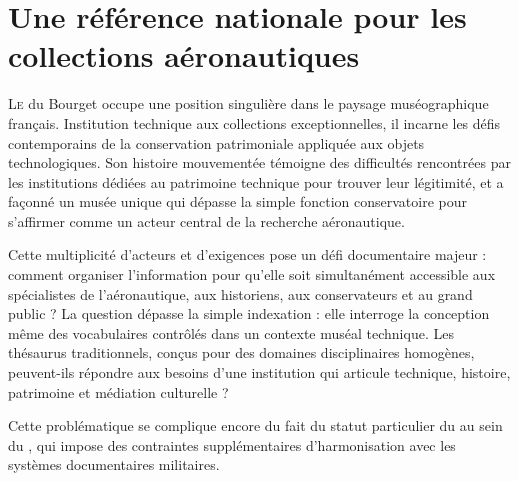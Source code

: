 \chapter[Référence nationale]{\label{I-A}Une référence nationale pour les collections aéronautiques}

\lettrine{L}e \mae du Bourget occupe une position singulière dans le paysage muséographique français. Institution technique aux collections exceptionnelles, il incarne les défis contemporains de la conservation patrimoniale appliquée aux objets technologiques. Son histoire mouvementée témoigne des difficultés rencontrées par les institutions dédiées au patrimoine technique pour trouver leur légitimité, et a façonné un musée unique qui dépasse la simple fonction conservatoire pour s'affirmer comme un acteur central de la recherche aéronautique.






\bigskip
\bigskip
\bigskip

Cette multiplicité d'acteurs et d'exigences pose un défi documentaire majeur : comment organiser l'information pour qu'elle soit simultanément accessible aux spécialistes de l'aéronautique, aux historiens, aux conservateurs et au grand public ? La question dépasse la simple indexation : elle interroge la conception même des vocabulaires contrôlés dans un contexte muséal technique. Les thésaurus traditionnels, conçus pour des domaines disciplinaires homogènes, peuvent-ils répondre aux besoins d'une institution qui articule technique, histoire, patrimoine et médiation culturelle ?

Cette problématique se complique encore du fait du statut particulier du \mae au sein du \minarm, qui impose des contraintes supplémentaires d'harmonisation avec les systèmes documentaires militaires.